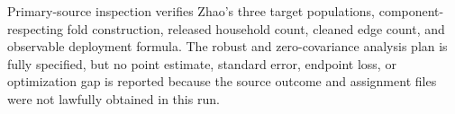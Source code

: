 Primary-source inspection verifies Zhao's three target populations, component-respecting fold construction, released household count, cleaned edge count, and observable deployment formula.  The robust and zero-covariance analysis plan is fully specified, but no point estimate, standard error, endpoint loss, or optimization gap is reported because the source outcome and assignment files were not lawfully obtained in this run.